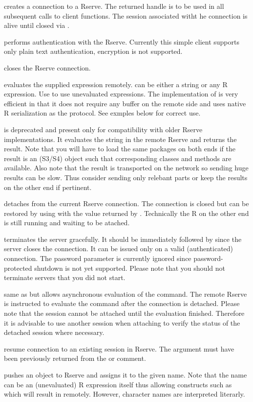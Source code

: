 \begin{Details}\relax
{} creates a connection to a Rserve. The returned handle
is to be used in all subsequent calls to client functions. The session
associated witht he connection is alive until closed via
.

 performs authentication with the Rserve. Currently this
simple client supports only plain text authentication, encryption is
not supported.

 closes the Rserve connection.

 evaluates the supplied expression
remotely.  can be either a string or any R
expression. Use  to use unevaluated
expressions. The implementation of  is very efficient
in that it does not require any buffer on the remote side and uses
native R serialization as the protocol. See exmples below for
correct use.

 is deprecated and present only for compatibility
with older Rserve implementations. It evaluates the string in the
remote Rserve and returns
the result. Note that you will have to load the same packages on both
ends if the result is an (S3/S4) object such that corresponding
classes and methods are available. Also note that the result is
transported on the network so sending huge results can be slow. Thus
consider sending only relebant parts or keep the results on the other
end if pertinent.

 detaches from the current Rserve connection. The
connection is closed but can be restored by using  with
the value returned by . Technically the R on the other
end is still running and waiting to be atached.

 terminates the server gracefully. It should be
immediately followed by  since the server closes the
connection. It can be issued only on a valid (authenticated)
connection. The password parameter is currently ignored since
password-protected shutdown is not yet supported. Please note that
you should not terminate servers that you did not start.

 same as  but allows asynchronous
evaluation of the command. The remote Rserve is instructed to evaluate
the command after the connection is detached. Please note that the
session cannot be attached until the evaluation finished. Therefore it
is advisable to use another session when attaching to verify the
status of the detached session where necessary.

 resume connection to an existing session in
Rserve. The  argument must have been previously returned
from the  or  comment.

 pushes an object to Rserve and assigns it to the given
name. Note that the name can be an (unevaluated) R expression itself
thus allowing constructs such as  which will result in 
remotely. However, character names are interpreted literarly.
\end{Details}
